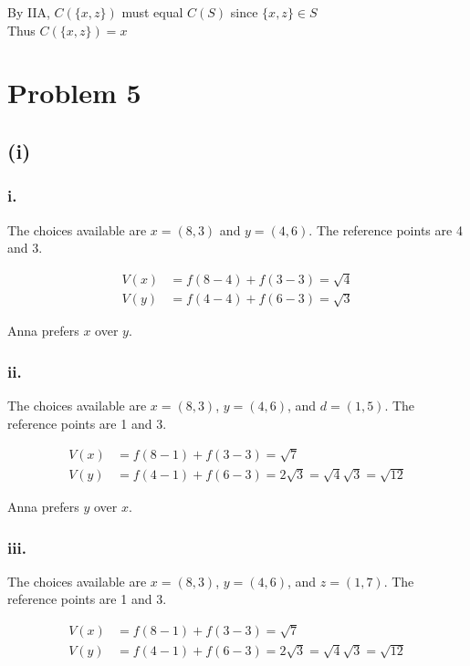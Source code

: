 \documentclass{article}
\begin{document}
\vspace{1em}
By IIA, \quad \( C(\{x, z\}) \) must equal \( C(S) \) since \( \{x, z\} \in S \) \\
Thus \( C(\{x, z\}) = x \)











\section*{Problem 5} %
\subsection*{(i)}
\subsubsection*{i.} The choices available are $x = (8, 3)$ and $y = (4, 6)$. The reference points are 4 and 3.

\begin{align*}
    V(x) &= f(8 - 4) + f(3 - 3) = \sqrt{4} \\
    V(y) &= f(4 - 4) + f(6 - 3) = \sqrt{3}
\end{align*}

Anna prefers $x$ over $y$.

\subsubsection*{ii.} The choices available are $x = (8, 3)$, $y = (4, 6)$, and $d = (1, 5)$. The reference points are 1 and 3.

\begin{align*}
    V(x) &= f(8 - 1) + f(3 - 3) = \sqrt{7} \\
    V(y) &= f(4 - 1) + f(6 - 3) = 2\sqrt{3} = \sqrt{4}\sqrt{3} = \sqrt{12} 
\end{align*}

Anna prefers $y$ over $x$.

\subsubsection*{iii.} The choices available are $x = (8, 3)$, $y = (4, 6)$, and $z = (1, 7)$. The reference points are 1 and 3.

\begin{align*}
    V(x) &= f(8 - 1) + f(3 - 3) = \sqrt{7} \\
    V(y) &= f(4 - 1) + f(6 - 3) = 2\sqrt{3} = \sqrt{4}\sqrt{3} = \sqrt{12}
\end{align*}
\end{document}
